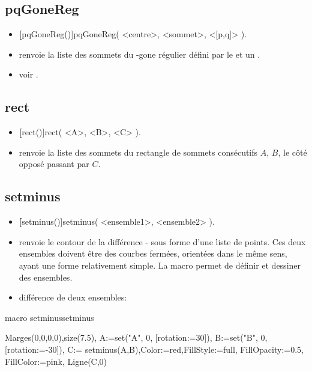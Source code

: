 \subsection{pqGoneReg}
\begin{itemize}
 \item \util \textbf[pqGoneReg()]{pqGoneReg( <centre>, <sommet>, <[p,q]> )}.
 \item \desc renvoie la liste des sommets du -gone régulier défini par le  et un .
 \item \exem voir .
\end{itemize}


\subsection{rect} 
\begin{itemize}
 \item \util \textbf[rect()]{rect( <A>, <B>, <C> )}.
 \item \desc renvoie la liste des sommets du rectangle de sommets consécutifs $A$, $B$, le côté opposé passant par $C$.
\end{itemize}

\subsection{setminus}
\begin{itemize}
 \item \util \textbf[setminus()]{setminus( <ensemble1>, <ensemble2> )}.
 \item \desc renvoie le contour de la différence  -  sous forme d'une liste de points. Ces deux ensembles doivent être des courbes fermées, orientées dans le même sens, ayant une forme relativement simple. La macro  permet de définir et dessiner des ensembles.
 \item \exem différence de deux ensembles:
\end{itemize}

\begin{demo}{macro setminus}{setminus}
\begin{texgraph}[name=setminus]
Marges(0,0,0,0),size(7.5),
A:=set("A", 0, [rotation:=30]), 
B:=set("B", 0, [rotation:=-30]),
C:= setminus(A,B),Color:=red,FillStyle:=full, 
FillOpacity:=0.5, FillColor:=pink,
Ligne(C,0)
\end{texgraph}
\end{demo}

